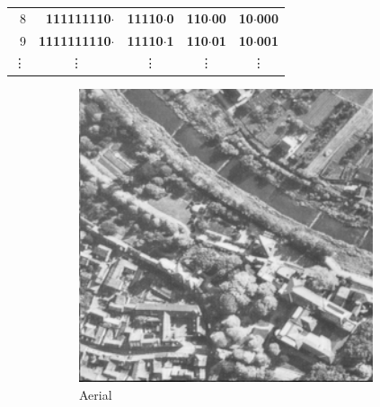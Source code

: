 \begin{table}[]
\begin{tabular}{rrrrr}
\multicolumn{1}{r|}{      8} & \textbf{111111110$\cdot$}   & \textbf{11110$\cdot$0}      & \textbf{110$\cdot$00}       & \textbf{10$\cdot$000}       \\
\multicolumn{1}{r|}{      9} & \textbf{1111111110$\cdot$}  & \textbf{11110$\cdot$1}      & \textbf{110$\cdot$01}       & \textbf{10$\cdot$001}       \\
\multicolumn{1}{r|}{ \vdots} & \multicolumn{1}{c}{\vdots}  & \multicolumn{1}{c}{\vdots}  & \multicolumn{1}{c}{\vdots}  & \multicolumn{1}{c}{\vdots} 
\end{tabular}
\end{table}

\begin{figure}
\centering
\begin{subfigure}[b]{.3\textwidth}
  \centering
  \includegraphics[width=0.95\textwidth]{figures/test-images/original/aerial}
  \caption{Aerial}
  \label{fig:test-images-aerial}
\end{subfigure}
\begin{subfigure}[b]{.3\textwidth}
  \centering

\end{subfigure}
\end{figure}
